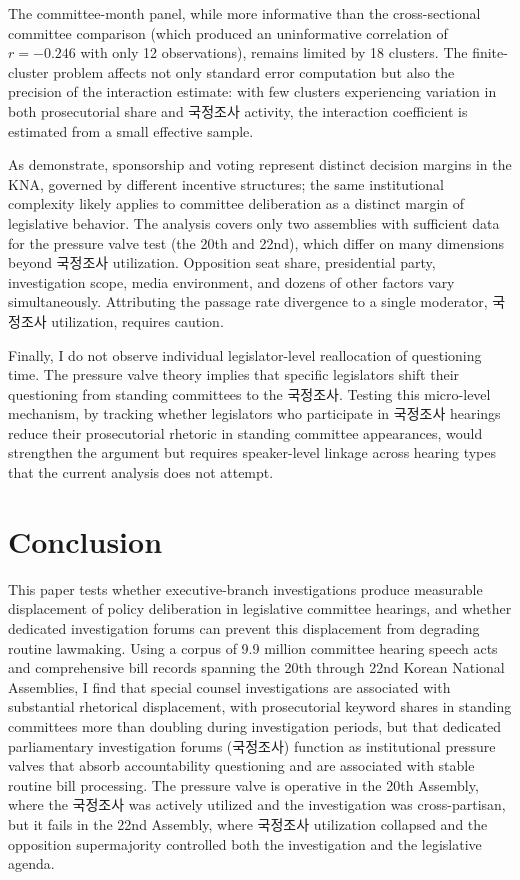 \documentclass[11pt]{article}
\begin{document}
The committee-month panel, while more informative than the cross-sectional committee comparison (which produced an uninformative correlation of $r = -0.246$ with only 12 observations), remains limited by 18 clusters. The finite-cluster problem affects not only standard error computation but also the precision of the interaction estimate: with few clusters experiencing variation in both prosecutorial share and 국정조사 activity, the interaction coefficient is estimated from a small effective sample.

As \citet{kangpark2025} demonstrate, sponsorship and voting represent distinct decision margins in the KNA, governed by different incentive structures; the same institutional complexity likely applies to committee deliberation as a distinct margin of legislative behavior. The analysis covers only two assemblies with sufficient data for the pressure valve test (the 20th and 22nd), which differ on many dimensions beyond 국정조사 utilization. Opposition seat share, presidential party, investigation scope, media environment, and dozens of other factors vary simultaneously. Attributing the passage rate divergence to a single moderator, 국정조사 utilization, requires caution.

Finally, I do not observe individual legislator-level reallocation of questioning time. The pressure valve theory implies that specific legislators shift their questioning from standing committees to the 국정조사. Testing this micro-level mechanism, by tracking whether legislators who participate in 국정조사 hearings reduce their prosecutorial rhetoric in standing committee appearances, would strengthen the argument but requires speaker-level linkage across hearing types that the current analysis does not attempt.


\section{Conclusion}
\label{sec:conclusion}

This paper tests whether executive-branch investigations produce measurable displacement of policy deliberation in legislative committee hearings, and whether dedicated investigation forums can prevent this displacement from degrading routine lawmaking. Using a corpus of 9.9 million committee hearing speech acts and comprehensive bill records spanning the 20th through 22nd Korean National Assemblies, I find that special counsel investigations are associated with substantial rhetorical displacement, with prosecutorial keyword shares in standing committees more than doubling during investigation periods, but that dedicated parliamentary investigation forums (국정조사) function as institutional pressure valves that absorb accountability questioning and are associated with stable routine bill processing. The pressure valve is operative in the 20th Assembly, where the 국정조사 was actively utilized and the investigation was cross-partisan, but it fails in the 22nd Assembly, where 국정조사 utilization collapsed and the opposition supermajority controlled both the investigation and the legislative agenda.
\end{document}
